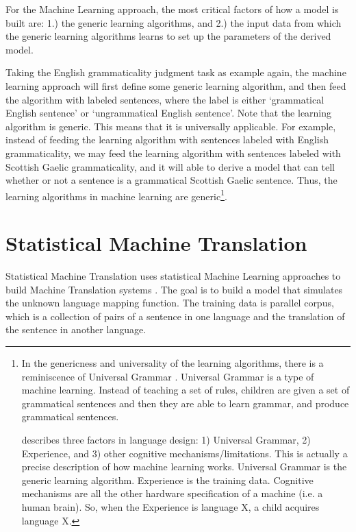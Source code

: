 For the Machine Learning approach, the most critical factors of how a model is built are: 1.) the generic learning algorithms, and 2.) the input data from which the generic learning algorithms learns to set up the parameters of the derived model.  

Taking the English grammaticality judgment task as example again, the machine learning approach will first define some generic learning algorithm, and then feed the algorithm with labeled sentences, where the label is either `grammatical English sentence' or `ungrammatical English sentence'. Note that the learning algorithm is generic. This means that it is universally applicable. For example, instead of feeding the learning algorithm with sentences labeled with English grammaticality, we may feed the learning algorithm with sentences labeled with Scottish Gaelic grammaticality, and it will able to derive a model that can tell whether or not a sentence is a grammatical Scottish Gaelic sentence. Thus, the learning algorithms in machine learning are generic\footnote{
In the genericness and universality of the learning algorithms, there is a reminiscence of Universal Grammar \citep{chomsky2007}. 
Universal Grammar is a type of machine learning. Instead of teaching a set of rules, children are given a set of grammatical sentences and then they are able to learn grammar, and produce grammatical sentences. 

\citet{chom2005_three_factors} describes three factors in language design: 1) Universal Grammar, 2) Experience, and 3) other cognitive mechanisms/limitations. This is actually a precise description of how machine learning works. Universal Grammar is the generic learning algorithm. Experience is the training data. Cognitive mechanisms are all the other hardware specification of a machine (i.e. a human brain). So, when the Experience is language X, a child acquires language X.}.  

  


\section{Statistical Machine Translation}
Statistical Machine Translation uses statistical Machine Learning approaches to build Machine Translation systems \citep{brown1988statistical, brown1990statistical, brown1993mathematics, koehn2009statistical, moses}. The goal is to build a model that simulates the unknown language mapping function. The training data is parallel corpus, which is a collection of pairs of a sentence in one language and the translation of the sentence in another language.

